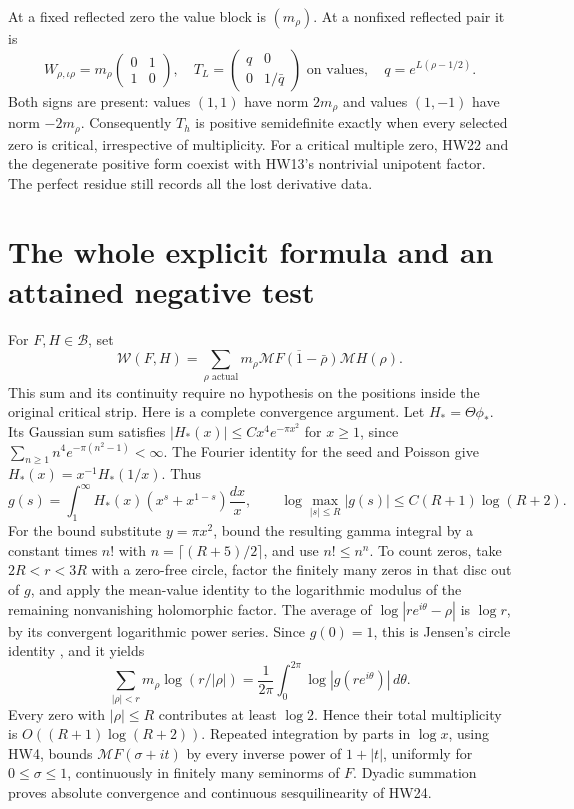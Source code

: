 \documentclass[11pt]{article}
\newcommand{\B}{\mathscr B}
\newcommand{\M}{\mathcal M}
\begin{document}
At a fixed reflected zero the value block is \((m_\rho)\).
At a nonfixed reflected pair it is
\[
 W_{\rho,\iota\rho}
   =m_\rho\begin{pmatrix}0&1\\1&0\end{pmatrix},
 \quad
 T_L=\begin{pmatrix}q&0\\0&1/\bar q\end{pmatrix}
       \text{ on values},\quad q=e^{L(\rho-1/2)}.
 \tag{HW23}\label{hw:hyperbolic}
\]
Both signs are present: values \((1,1)\) have norm \(2m_\rho\)
and values \((1,-1)\) have norm \(-2m_\rho\).
Consequently \(T_h\) is positive semidefinite exactly when
every selected zero is critical, irrespective of multiplicity.
For a critical multiple zero, HW22 and the degenerate positive
form coexist with HW13's nontrivial unipotent factor.
The perfect residue still records all the lost derivative data.

\section{The whole explicit formula and an attained negative test}

For \(F,H\in\B\), set
\[
 \mathcal W(F,H)=\sum_{\rho\text{ actual}}
       m_\rho\overline{\M F(1-\bar\rho)}\M H(\rho).
 \tag{HW24}\label{hw:globalweil}
\]
This sum and its continuity require no hypothesis on the positions
inside the original critical strip. Here is a complete convergence
argument. Let \(H_*=\Theta\phi_*\). Its Gaussian sum satisfies
\(|H_*(x)|\le Cx^4e^{-\pi x^2}\) for \(x\ge1\), since
\(\sum_{n\ge1}n^4e^{-\pi(n^2-1)}<\infty\).
The Fourier identity for the seed and Poisson give
\(H_*(x)=x^{-1}H_*(1/x)\). Thus
\[
 g(s)=\int_1^\infty H_*(x)(x^s+x^{1-s})\frac{dx}{x},
 \qquad \log\max_{|s|\le R}|g(s)|
              \le C(R+1)\log(R+2).
 \tag{HW25}
\]
For the bound substitute \(y=\pi x^2\), bound the resulting
gamma integral by a constant times \(n!\) with
\(n=\lceil(R+5)/2\rceil\), and use \(n!\le n^n\).
To count zeros, take \(2R<r<3R\) with a zero-free circle,
factor the finitely many zeros in that disc out of \(g\), and
apply the mean-value identity to the logarithmic modulus of the
remaining nonvanishing holomorphic factor. The average of
\(\log|re^{i\theta}-\rho|\) is \(\log r\), by its convergent
logarithmic power series. Since \(g(0)=1\), this is Jensen's
circle identity \cite{Jensen}, and it yields
\[
 \sum_{|\rho|<r}m_\rho\log(r/|\rho|)
  =\frac1{2\pi}\int_0^{2\pi}\log|g(re^{i\theta})|\,d\theta .
 \tag{HW26}
\]
Every zero with \(|\rho|\le R\) contributes at least \(\log2\).
Hence their total multiplicity is \(O((R+1)\log(R+2))\).
Repeated integration by parts in \(\log x\), using HW4,
bounds \(\M F(\sigma+it)\) by every inverse power of
\(1+|t|\), uniformly for \(0\le\sigma\le1\), continuously
in finitely many seminorms of \(F\).
Dyadic summation proves absolute convergence and continuous
sesquilinearity of HW24.
\end{document}
